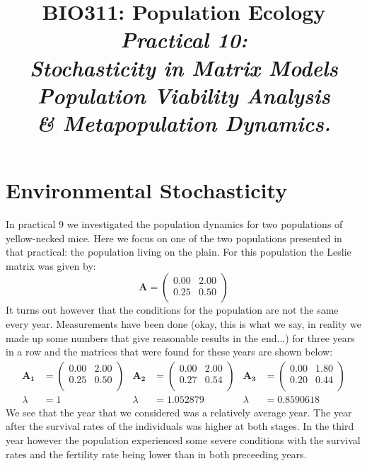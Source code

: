 \documentclass{article}\usepackage[]{graphicx}\usepackage[]{color}
\title{BIO311: Population Ecology\\ \textit{Practical 10:\\ Stochasticity in Matrix Models\\ Population Viability Analysis\\ \& Metapopulation Dynamics.}}
\begin{document}


\maketitle
\tableofcontents
\vspace{3cm}

\newpage


\section{Environmental Stochasticity}
In practical $9$ we investigated the population dynamics for two populations of yellow-necked mice. Here we focus on one of the two populations presented in that practical: the population living on the plain. For this population the Leslie matrix was given by:
\begin{equation*} \boldsymbol{A}=%
\begin{pmatrix}{}
  0.00 & 2.00 \\ 
  0.25 & 0.50 \\ 
  \end{pmatrix}
\end{equation*}
It turns out however that the conditions for the population are not the same every year. Measurements have been done (okay, this is what we say, in reality we made up some numbers that give reasonable results in the end...) for three years in a row and the matrices that were found for these years are shown below:
\begin{align*}\boldsymbol{A_1} &=%
\begin{pmatrix}{}
  0.00 & 2.00 \\ 
  0.25 & 0.50 \\ 
  \end{pmatrix}
& \boldsymbol{A_2} &=%
\begin{pmatrix}{}
  0.00 & 2.00 \\ 
  0.27 & 0.54 \\ 
  \end{pmatrix}
& \boldsymbol{A_3} &=%
\begin{pmatrix}{}
  0.00 & 1.80 \\ 
  0.20 & 0.44 \\ 
  \end{pmatrix}
\\ \lambda &= 1 &\lambda &= 1.052879 &\lambda &= 0.8590618\end{align*}
We see that the year that we considered was a relatively average year. The year after the survival rates of the individuals was higher at both stages. In the third year however the population experienced some severe conditions with the survival rates and the fertility rate being lower than in both preceeding years.
\end{document}
